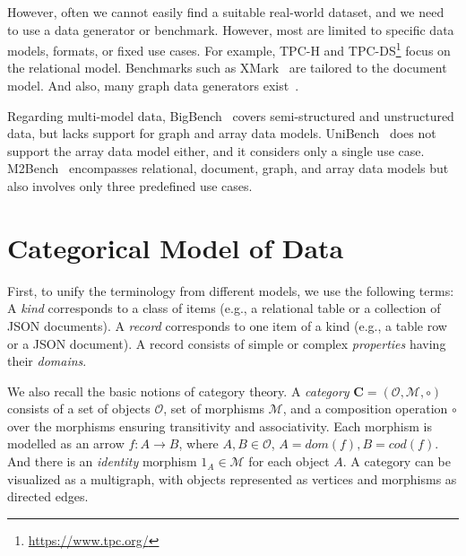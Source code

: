 However, often we cannot easily find a suitable real-world dataset, and we need to use a data generator or benchmark. However, most are limited to specific data models, formats, or fixed use cases. For example, TPC-H and TPC-DS\footnote{\url{https://www.tpc.org/}} focus on the relational model. Benchmarks such as XMark~\citep{10.5555/1287369.1287455} are tailored to the document model. And also, many graph data generators exist~\citep{10.1145/3379445}. 

Regarding multi-model data, BigBench~\citep{10.1145/2463676.2463712} covers semi-structured and unstructured data, but lacks support for graph and array data models. UniBench~\citep{unibench} does not support the array data model either, and it considers only a single use case. M2Bench~\citep{10.14778/3574245.3574259} encompasses relational, document, graph, and array data models but also involves only three predefined use cases.


\section{Categorical Model of Data}

First, to unify the terminology from different models, we use the following terms: A \textit{kind} corresponds to a class of items (e.g., a relational table or a collection of JSON documents). A \textit{record} corresponds to one item of a kind (e.g., a table row or a JSON document). A record consists of simple or complex \textit{properties} having their \textit{domains}.

We also recall the basic notions of category theory.
A \textit{category} $\mathbf{C} = (\mathcal{O}, \mathcal{M}, \circ)$ consists of a set of objects $\mathcal{O}$, set of morphisms $\mathcal{M}$, and a composition operation $\circ$ over the morphisms ensuring transitivity and associativity. Each morphism is modelled as an arrow $f : A \rightarrow B$, where $A, B \in \mathcal{O}$, $A = dom(f), B = cod(f)$. And there is an \textit{identity} morphism $1_A \in \mathcal{M}$ for each object $A$. A category can be visualized as a multigraph, with objects represented as vertices and morphisms as directed edges.

